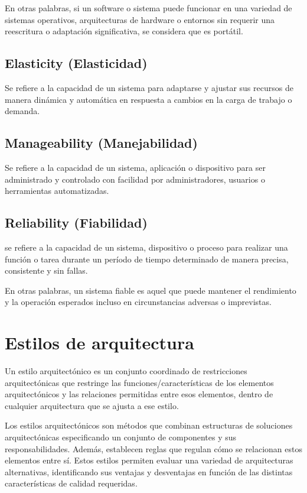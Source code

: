 \documentclass{article}
\begin{document}
		En otras palabras, si un software o sistema puede funcionar en una variedad de sistemas operativos, arquitecturas de hardware o entornos sin requerir una reescritura o adaptación significativa, se considera que es portátil.
		
		\subsection{Elasticity \small{(Elasticidad)}}
		Se refiere a la capacidad de un sistema para adaptarse y ajustar sus recursos de manera dinámica y automática en respuesta a cambios en la carga de trabajo o demanda.
		
		\subsection{Manageability  \small{(Manejabilidad)}}
		Se refiere a la capacidad de un sistema, aplicación o dispositivo para ser administrado y controlado con facilidad por administradores, usuarios o herramientas automatizadas.
		
		\subsection{Reliability  \small{(Fiabilidad)}}
		se refiere a la capacidad de un sistema, dispositivo o proceso para realizar una función o tarea durante un período de tiempo determinado de manera precisa, consistente y sin fallas.
		
		En otras palabras, un sistema fiable es aquel que puede mantener el rendimiento y la operación esperados incluso en circunstancias adversas o imprevistas.
		
		
		
		\section{Estilos de arquitectura}
		Un estilo arquitectónico es un conjunto coordinado de restricciones arquitectónicas que restringe las
		funciones/características de los elementos arquitectónicos y las relaciones permitidas	entre esos elementos, dentro de cualquier arquitectura que se ajusta a ese estilo.
		
		Los estilos arquitectónicos son métodos que combinan estructuras de soluciones arquitectónicas especificando un conjunto de componentes y sus responsabilidades. Además, establecen reglas que regulan cómo se relacionan estos elementos entre sí. Estos estilos permiten evaluar una variedad de arquitecturas alternativas, identificando sus ventajas y desventajas en función de las distintas características de calidad requeridas.
		
\end{document}
